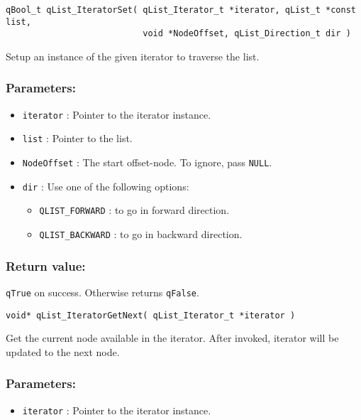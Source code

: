 \noindent\hrulefill

\begin{lstlisting}[style=CStyle]
qBool_t qList_IteratorSet( qList_Iterator_t *iterator, qList_t *const list, 
                           void *NodeOffset, qList_Direction_t dir )
\end{lstlisting} 

Setup an instance of the given iterator to traverse the list.

\subsubsection*{Parameters:}
\begin{itemize}
    \item \lstinline{iterator} : Pointer to the iterator instance. 
    \item \lstinline{list} : Pointer to the list.
    \item \lstinline{NodeOffset} : The start offset-node. To ignore, pass \lstinline{NULL}.
    \item \lstinline{dir} : Use one of the following options:
        \begin{itemize}
            \item \lstinline{QLIST_FORWARD} : to go in forward direction.
            \item \lstinline{QLIST_BACKWARD} : to go in backward direction.
        \end{itemize}
\end{itemize}

\subsubsection*{Return value:}
\lstinline{qTrue} on success. Otherwise returns \lstinline{qFalse}. 

\noindent\hrulefill

\begin{lstlisting}[style=CStyle]
void* qList_IteratorGetNext( qList_Iterator_t *iterator )
\end{lstlisting} 

Get the current node available in the iterator. After invoked, iterator will be updated to the next node.

\subsubsection*{Parameters:}
\begin{itemize}
    \item \lstinline{iterator} : Pointer to the iterator instance. 
\end{itemize}


